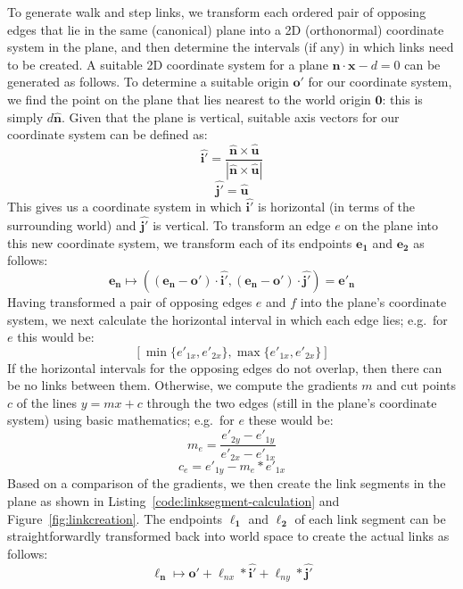 \documentclass[10pt,twocolumn]{article}
\begin{document}
To generate walk and step links, we transform each ordered pair\footnotemark{} of opposing edges that lie in the same (canonical) plane into a 2D (orthonormal) coordinate system in the plane, and then determine the intervals (if any) in which links need to be created. A suitable 2D coordinate system for a plane $\mathbf{\hat{n}} \cdot \mathbf{x} - d = 0$ can be generated as follows. To determine a suitable origin $\mathbf{o'}$ for our coordinate system, we find the point on the plane that lies nearest to the world origin $\mathbf{0}$: this is simply $d\mathbf{\hat{n}}$. Given that the plane is vertical, suitable axis vectors for our coordinate system can be defined as:
%
\[
\mathbf{\hat{i'}} = \frac{\mathbf{\hat{n}} \times \mathbf{\hat{u}}}{\left| \mathbf{\hat{n}} \times \mathbf{\hat{u}} \right|}
\]
\[
\mathbf{\hat{j'}} = \mathbf{\hat{u}}
\]
%
This gives us a coordinate system in which $\mathbf{\hat{i'}}$ is horizontal (in terms of the surrounding world) and $\mathbf{\hat{j'}}$ is vertical. To transform an edge $e$ on the plane into this new coordinate system, we transform each of its endpoints $\mathbf{e_1}$ and $\mathbf{e_2}$ as follows:
%
\[
\mathbf{e_n} \mapsto ((\mathbf{e_n} - \mathbf{o'}) \cdot \mathbf{\hat{i'}}, (\mathbf{e_n} - \mathbf{o'}) \cdot \mathbf{\hat{j'}}) = \mathbf{e'_n}
\]
%
Having transformed a pair of opposing edges $e$ and $f$ into the plane's coordinate system, we next calculate the horizontal interval in which each edge lies; e.g.~for $e$ this would be:
%
\[
\left[ \min\{e'_{1x},e'_{2x}\}, \max\{e'_{1x},e'_{2x}\} \right]
\]
%
If the horizontal intervals for the opposing edges do not overlap, then there can be no links between them. Otherwise, we compute the gradients $m$ and cut points $c$ of the lines $y = mx + c$ through the two edges (still in the plane's coordinate system) using basic mathematics; e.g.~for $e$ these would be:
%
\[
m_e = \frac{e'_{2y} - e'_{1y}}{e'_{2x} - e'_{1x}}
\]
\[
c_e = e'_{1y} - m_e * e'_{1x}
\]
%
Based on a comparison of the gradients, we then create the link segments in the plane as shown in Listing~\ref{code:linksegment-calculation} and Figure~\ref{fig:linkcreation}. The endpoints $\mathbf{\ell_1}$ and $\mathbf{\ell_2}$ of each link segment can be straightforwardly transformed back into world space to create the actual links as follows:
%
\[
\mathbf{\ell_n} \mapsto \mathbf{o'} + \ell_{nx} * \mathbf{\hat{i'}} + \ell_{ny} * \mathbf{\hat{j'}}
\]

\end{document}
